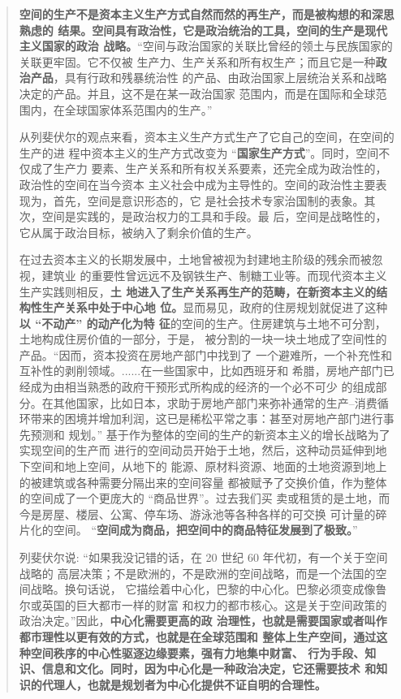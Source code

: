 \begin{quotation}
  \textbf{空间的生产不是资本主义生产方式自然而然的再生产，而是被构想的和深思熟虑的
    结果。空间具有政治性，它是政治统治的工具，空间的生产是现代主义国家的政治
    战略。}“空间与政治国家的关联比曾经的领土与民族国家的关联更牢固。它不仅被
  生产力、生产关系和所有权生产；而且它是一种\textbf{政治产品}，具有行政和残暴统治性
  的产品、由政治国家上层统治关系和战略决定的产品。并且，这不是在某一政治国家
  范围内，而是在国际和全球范围内，在全球国家体系范围内的生产。”

  从列斐伏尔的观点来看，资本主义生产方式生产了它自己的空间，在空间的生产的进
  程中资本主义的生产方式改变为 “\textbf{国家生产方式}”。同时，空间不仅成了生产力
  要素、生产关系和所有权关系要素，还完全成为政治性的，政治性的空间在当今资本
  主义社会中成为主导性的。空间的政治性主要表现为，首先，空间是意识形态的，它
  是社会技术专家治国制的表象。其次，空间是实践的，是政治权力的工具和手段。最
  后，空间是战略性的，它从属于政治目标，被纳入了剩余价值的生产。

  在过去资本主义的长期发展中，土地曾被视为封建地主阶级的残余而被忽视，建筑业
  的重要性曾远远不及钢铁生产、制糖工业等。而现代资本主义生产实践则相反，\textbf{土
    地进入了生产关系再生产的范畴，在新资本主义的结构性生产关系中处于中心地
    位。}显而易见，政府的住房规划就促进了这种\textbf{以 “不动产” 的动产化为特
    征}的空间的生产。住房建筑与土地不可分割，土地构成住房价值的一部分，于是，
  被分割的一块一块土地成了空间性的产品。“因而，资本投资在房地产部门中找到了
  一个避难所，一个补充性和互补性的剥削领域。......在一些国家中，比如西班牙和
  希腊，房地产部门已经成为由相当熟悉的政府干预形式所构成的经济的一个必不可少
  的组成部分。在其他国家，比如日本，求助于房地产部门来弥补通常的生产--消费循
  环带来的困境并增加利润，这已是稀松平常之事：甚至对房地产部门进行事先预测和
  规划。” 基于作为整体的空间的生产的新资本主义的增长战略为了实现空间的生产而
  进行的空间动员开始于土地，然后，这种动员延伸到地下空间和地上空间，从地下的
  能源、原材料资源、地面的土地资源到地上的被建筑或各种需要分隔出来的空间容量
  都被赋予了交换价值，作为整体的空间成了一个更庞大的 “商品世界”。过去我们买
  卖或租赁的是土地，而今是房屋、楼层、公寓、停车场、游泳池等各种各样的可交换
  可计量的碎片化的空间。 “\textbf{空间成为商品，把空间中的商品特征发展到了极致。}”

  列斐伏尔说: “如果我没记错的话，在 20 世纪 60 年代初，有一个关于空间战略的
  高层决策；不是欧洲的，不是欧洲的空间战略，而是一个法国的空间战略。换句话说，
  它描绘着中心化，巴黎的中心化。巴黎必须变成像鲁尔或英国的巨大都市一样的财富
  和权力的都市核心。这是关于空间政策的政治决定。”因此，\textbf{中心化需要更高的政
    治理性，也就是需要国家或者叫作都市理性以更有效的方式，也就是在全球范围和
    整体上生产空间，通过这种空间秩序的中心性驱逐边缘要素，强有力地集中财富、
    行为手段、知识、信息和文化。同时，因为中心化是一种政治决定，它还需要技术
    和知识的代理人，也就是规划者为中心化提供不证自明的合理性。}


\end{quotation}
